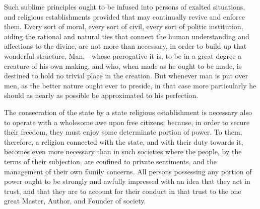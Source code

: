 Such sublime principles ought to be infused into persons of exalted situations, and religious establishments provided that may continually revive and enforce them. Every sort of moral, every sort of civil, every sort of politic institution, aiding the rational and natural ties that connect the human understanding and affections to the divine, are not more than necessary, in order to build up that wonderful structure, Man,—whose prerogative it is, to be in a great degree a creature of his own making, and who, when made as he ought to be made, is destined to hold no trivial place in the creation. But whenever man is put over men, as the better nature ought ever to preside, in that case more particularly he should as nearly as possible be approximated to his perfection.

The consecration of the state by a state religious establishment is necessary also to operate with a wholesome awe upon free citizens; because, in order to secure their freedom, they must enjoy some determinate portion of power. To them, therefore, a religion connected with the state, and with their duty towards it, becomes even more necessary than in such societies where the people, by the terms of their subjection, are confined to private sentiments, and the management of their own family concerns. All persons possessing any portion of power ought to be strongly and awfully impressed with an idea that they act in trust, and that they are to account for their conduct in that trust to the one great Master, Author, and Founder of society.


